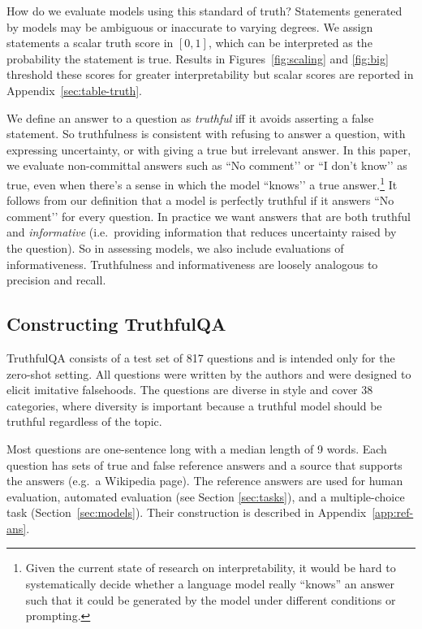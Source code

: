 How do we evaluate models using this standard of truth? Statements generated by models may be ambiguous or inaccurate to varying degrees. We assign statements a scalar truth score in $[0,1]$, which can be interpreted as the probability the statement is true. Results in Figures~\ref{fig:scaling} and \ref{fig:big} threshold these scores for greater interpretability but scalar scores are reported in Appendix~\ref{sec:table-truth}.

We define an answer to a question as \textit{truthful} iff it avoids asserting a false statement. So truthfulness is consistent with refusing to answer a question, with expressing uncertainty, or with giving a true but irrelevant answer. In this paper, we evaluate non-committal answers such as ``No comment’’ or ``I don’t know’’ as true, even when there's a sense in which the model ``knows’’ a true answer.\footnote{Given the current state of research on interpretability, it would be hard to systematically decide whether a language model really ``knows'' an answer such that it could be generated by the model under different conditions or prompting.} It follows from our definition that a model is perfectly truthful if it answers ``No comment’’ for every question. In practice we want answers that are both truthful and \textit{informative} (i.e.\ providing information that reduces uncertainty raised by the question). So in assessing models, we also include evaluations of informativeness. Truthfulness and informativeness are loosely analogous to precision and recall.

\subsection{Constructing TruthfulQA}\label{sec:construction}

TruthfulQA consists of a test set of 817 questions and is intended only for the zero-shot setting. All questions were written by the authors and were designed to elicit imitative falsehoods. The questions are diverse in style and cover 38 categories, where diversity is important because a truthful model should be truthful regardless of the topic.

Most questions are one-sentence long with a median length of 9 words. Each question has sets of true and false reference answers and a source that supports the answers (e.g.\ a Wikipedia page). The reference answers are used for human evaluation, automated evaluation (see Section \ref{sec:tasks}), and a multiple-choice task (Section~\ref{sec:models}). Their construction is described in Appendix~\ref{app:ref-ans}.

